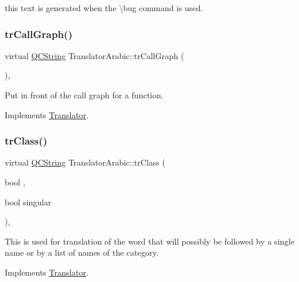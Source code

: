this text is generated when the \textbackslash{}bug command is used. \mbox{\label{class_translator_arabic_a653f65a872ca15cf8b8cc117819f6ba1}} 
\subsubsection{\texorpdfstring{trCallGraph()}{trCallGraph()}}
{\footnotesize\ttfamily virtual \mbox{\hyperlink{class_q_c_string}{Q\+C\+String}} Translator\+Arabic\+::tr\+Call\+Graph (\begin{DoxyParamCaption}{ }\end{DoxyParamCaption})\hspace{0.3cm}{\ttfamily [inline]}, {\ttfamily [virtual]}}

Put in front of the call graph for a function. 

Implements \mbox{\hyperlink{class_translator}{Translator}}.

\mbox{\label{class_translator_arabic_af60f81882a17979949235c2b0ddf0691}} 
\subsubsection{\texorpdfstring{trClass()}{trClass()}}
{\footnotesize\ttfamily virtual \mbox{\hyperlink{class_q_c_string}{Q\+C\+String}} Translator\+Arabic\+::tr\+Class (\begin{DoxyParamCaption}\item[{bool}]{,  }\item[{bool}]{singular }\end{DoxyParamCaption})\hspace{0.3cm}{\ttfamily [inline]}, {\ttfamily [virtual]}}

This is used for translation of the word that will possibly be followed by a single name or by a list of names of the category. 

Implements \mbox{\hyperlink{class_translator}{Translator}}.

\mbox{\label{class_translator_arabic_a87f8377933d06087c5f870a8d72787b6}} 
